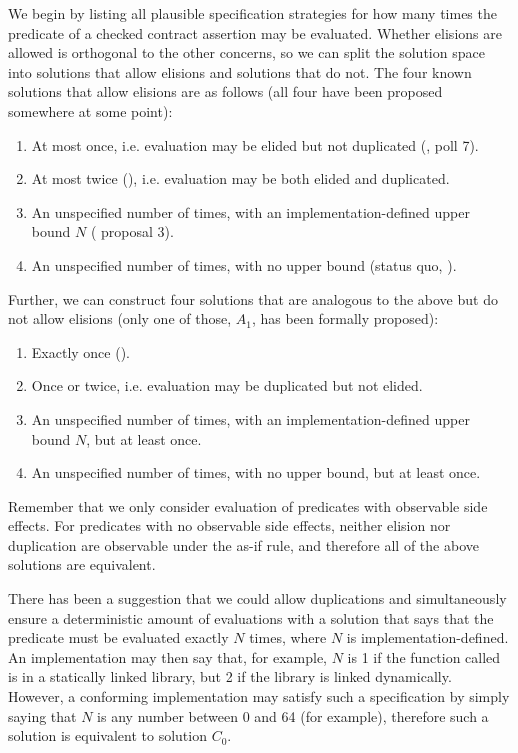 We begin by listing all plausible specification strategies for how many times the predicate of a checked contract assertion may be evaluated. Whether elisions are allowed is orthogonal to the other concerns, so we can split the solution space into solutions that allow elisions and solutions that do not. The four known solutions that allow elisions are as follows (all four have been proposed somewhere at some point):
\renewcommand{\theenumi}{$\Alph{enumi}_0$}
\begin{enumerate}
\item At most once, i.e. evaluation may be elided but not duplicated (\cite{P1670R0}, \cite{D3197R0} poll 7).
\item At most twice (\cite{P2521R5}), i.e. evaluation may be both elided and duplicated.
\item An unspecified number of times, with an implementation-defined upper bound $N$ (\cite{P3119R0} proposal 3).
\item An unspecified number of times, with no upper bound (status quo, \cite{P2900R6}).
\end{enumerate}
Further, we can construct four solutions that are analogous to the above but do not allow elisions (only one of those, $A_1$, has been formally proposed):
\renewcommand{\theenumi}{$\Alph{enumi}_1$}
\begin{enumerate}
\item Exactly once (\cite{P2756R0}).
\item Once or twice, i.e. evaluation may be duplicated but not elided.
\item An unspecified number of times, with an implementation-defined upper bound $N$, but at least once.
\item An unspecified number of times, with no upper bound, but at least once.
\end{enumerate}

Remember that we only consider evaluation of predicates with observable side effects. For predicates with no observable side effects, neither elision nor duplication are observable under the as-if rule, and therefore all of the above solutions are equivalent.

There has been a suggestion that we could allow duplications and simultaneously ensure a deterministic amount of evaluations with a solution that says that the predicate must be evaluated exactly $N$ times, where $N$ is implementation-defined. An implementation may then say that, for example, $N$ is 1 if the function called is in a statically linked library, but 2 if the library is linked dynamically. However, a conforming implementation may satisfy such a specification by simply saying that $N$ is any number between 0 and 64 (for example), therefore such a solution is equivalent to solution $C_0$.

